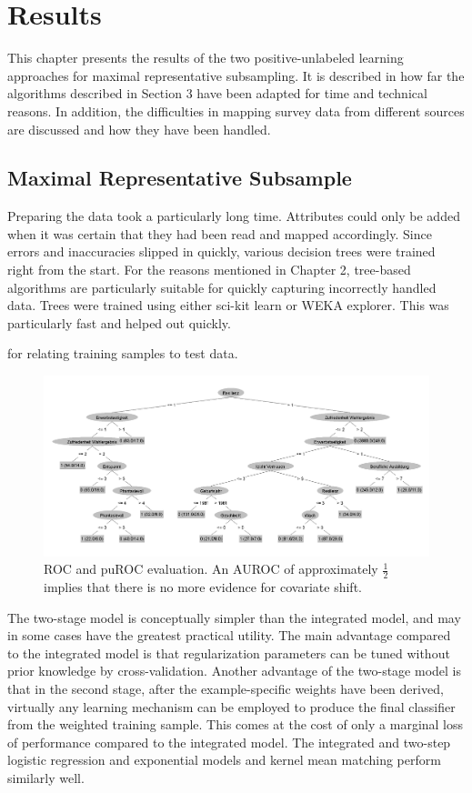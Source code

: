 \chapter{Results}\label{Sec:Results}

This chapter presents the results of the two positive-unlabeled learning approaches for maximal representative subsampling. It is described in how far the algorithms described in Section 3 have been adapted for time and technical reasons. In addition, the difficulties in mapping survey data from different sources are discussed and how they have been handled.

\section{Maximal Representative Subsample}

Preparing the data took a particularly long time. Attributes could only be added when it was certain that they had been read and mapped accordingly. Since errors and inaccuracies slipped in quickly, various decision trees were trained right from the start. For the reasons mentioned in Chapter 2, tree-based algorithms are particularly suitable for quickly capturing incorrectly handled data. Trees were trained using either sci-kit learn or WEKA explorer. This was particularly fast and helped out quickly.

for relating training samples to test data. 

\begin{figure}[ht]
\centering
   \includegraphics[scale=0.30,angle=0]{fig/j48}
\captionsetup{width= 400pt}
\caption{ROC and puROC evaluation. An AUROC of approximately \(\frac{1}{2}\) implies that there is no more evidence for covariate shift.}
   \label{fig:Ng1} 
\end{figure}

The two-stage model is conceptually simpler than the integrated model, and may in some cases have the greatest practical utility. The main advantage compared to the integrated model is that regularization parameters can be tuned without prior knowledge by cross-validation. Another advantage of the two-stage model is that in the second stage, after the example-speciﬁc weights have been derived, virtually any learning mechanism can be employed to produce the ﬁnal classiﬁer from the weighted training sample. This comes at the cost of only a marginal loss of performance compared to the integrated model. The integrated and two-step logistic regression and exponential models and kernel mean matching perform similarly well.

